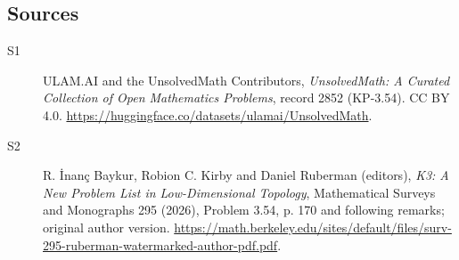\documentclass[11pt]{article}
\begin{document}
\subsection{Sources}
\begin{description}
\item[\hypertarget{source:2852:1}{S1}] ULAM.AI and the UnsolvedMath Contributors, \emph{UnsolvedMath: A Curated Collection of Open Mathematics Problems}, record 2852 (KP-3.54). CC BY 4.0. \url{https://huggingface.co/datasets/ulamai/UnsolvedMath}.
\item[\hypertarget{source:2852:2}{S2}] R. İnanç Baykur, Robion C. Kirby and Daniel Ruberman (editors), \emph{K3: A New Problem List in Low-Dimensional Topology}, Mathematical Surveys and Monographs 295 (2026), Problem 3.54, p. 170 and following remarks; original author version. \url{https://math.berkeley.edu/sites/default/files/surv-295-ruberman-watermarked-author-pdf.pdf}.
\end{description}
\label{end:2852}
\end{document}
